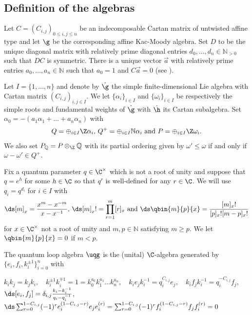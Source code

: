 \documentclass[11pt]{amsart}
\theoremstyle{definition}
\theoremstyle{remark}
\numberwithin{equation}{section}
\begin{document}
\subsection{Definition of the algebras}\label{sec:DefQaff} Let $C = (C_{i,j})_{0\leq i,j\leq n}$ be an indecomposable Cartan matrix of untwisted affine type and let $\g$ be the corresponding affine Kac-Moody algebra. Set $D$ to be the unique diagonal matrix with relatively prime diagonal entries $d_0,\dots ,d_n \in \mathbb{N}_{>0}$ such that $DC$ is symmetric. There is a unique vector $\vec{a}$ with relatively prime entries $a_0,\dots ,a_n \in \mathbb{N}$ such that $a_0 = 1$ and $C \vec{a} = 0$ (see \cite[Chapter 4]{kac}). \par
Let $I = \{1,\dots ,n\}$ and denote by $\dot{\g}$ the simple finite-dimensional Lie algebra with Cartan matrix $(C_{i,j})_{i,j\in I}$. We let $\{\alpha_i\}_{i\in I}$ and $\{\omega_i\}_{i\in I}$ be respectively the simple roots and fundamental weights of $\dot{\g}$ with $\dot{\h}$ its Cartan subalgebra. Set $\alpha_0 = -(a_1\alpha_1+\dots +a_n\alpha_n)$ with 
$$ Q = \oplus_{i\in I} \Z\alpha_i,\, Q^+ = \oplus_{i\in I} \mathbb{N} \alpha_i\text{ and }P = \oplus_{i\in I} \Z \omega_i. $$
We also set $P_{\mathbb{Q}} = P\otimes_{\Z}\mathbb{Q}$ with its partial ordering given by $\omega' \leq \omega$ if and only if $\omega-\omega' \in Q^+$. \par 
Fix a quantum parameter $q \in \C^{\times}$ which is not a root of unity and suppose that $q=e^h$ for some $h \in \C$ so that $q^r$ is well-defined for any $r \in \C$. We will use $q_i = q^{d_i}$ for $i\in I$ with
$$\ds [m]_x = \frac{x^m-x^{-m}}{x-x^{-1}},\, \ds [m]_x! = \prod_{r=1}^m [r]_x\text{ and }\ds \qbin{m}{p}{x} = \frac{[m]_x!}{[p]_x![m-p]_x!}$$
for $x\in \C^{\times}$ not a root of unity and $m,p \in \mathbb{N}$ satisfying $m\geq p$. We let $\qbin{m}{p}{x}=0$ if $m<p$. \par\noindent
The quantum loop algebra $\uqg$ is the (unital) $\C$-algebra generated by $\{e_i,f_i,k_i^{\pm 1}\}_{i=0}^n$ with 
\begin{center}
$k_ik_j = k_jk_i, \quad k_i^{\pm 1}k_i^{\mp 1} = 1 = k_0^{a_0}k_1^{a_1}\dots k_n^{a_n}, \quad k_ie_jk_i^{-1} = q_i^{C_{i,j}}e_j,\quad k_if_jk_i^{-1} = q_i^{-C_{i,j}}f_j,$\smallskip\\
$\ds[e_i,f_j] = \delta_{i,j}\frac{k_i-k_i^{-1}}{q_i-q_i^{-1}}$, \quad $\ds\sum_{r=0}^{1-C_{i,j}}(-1)^re_i^{(1-C_{i,j}-r)}e_je_i^{(r)}=\sum_{r=0}^{1-C_{i,j}}(-1)^rf_i^{(1-C_{i,j}-r)}f_jf_i^{(r)} = 0$
\end{center}
\end{document}
